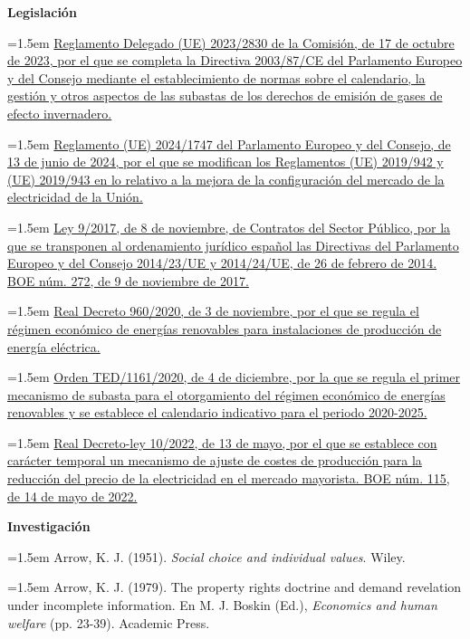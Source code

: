 \documentclass[10pt,a4paper]{article}
\begin{document}
\textbf{Legislación}

\noindent\hangindent=1.5em \href{https://eur-lex.europa.eu/eli/reg_del/2023/2830/oj}{Reglamento Delegado (UE) 2023/2830 de la Comisión, de 17 de octubre de 2023, por el que se completa la Directiva 2003/87/CE del Parlamento Europeo y del Consejo mediante el establecimiento de normas sobre el calendario, la gestión y otros aspectos de las subastas de los derechos de emisión de gases de efecto invernadero.}

\noindent\hangindent=1.5em \href{https://eur-lex.europa.eu/eli/reg/2024/1747/oj}{Reglamento (UE) 2024/1747 del Parlamento Europeo y del Consejo, de 13 de junio de 2024, por el que se modifican los Reglamentos (UE) 2019/942 y (UE) 2019/943 en lo relativo a la mejora de la configuración del mercado de la electricidad de la Unión.}

\noindent\hangindent=1.5em \href{https://www.boe.es/eli/es/l/2017/11/08/9}{Ley 9/2017, de 8 de noviembre, de Contratos del Sector Público, por la que se transponen al ordenamiento jurídico español las Directivas del Parlamento Europeo y del Consejo 2014/23/UE y 2014/24/UE, de 26 de febrero de 2014. BOE núm. 272, de 9 de noviembre de 2017.}

\noindent\hangindent=1.5em \href{https://www.boe.es/eli/es/rd/2020/11/03/960}{Real Decreto 960/2020, de 3 de noviembre, por el que se regula el régimen económico de energías renovables para instalaciones de producción de energía eléctrica.}

\noindent\hangindent=1.5em \href{https://www.boe.es/eli/es/o/2020/12/04/ted1161}{Orden TED/1161/2020, de 4 de diciembre, por la que se regula el primer mecanismo de subasta para el otorgamiento del régimen económico de energías renovables y se establece el calendario indicativo para el periodo 2020-2025.}

\noindent\hangindent=1.5em \href{https://www.boe.es/boe/dias/2022/05/14/pdfs/BOE-A-2022-7843.pdf}{Real Decreto-ley 10/2022, de 13 de mayo, por el que se establece con carácter temporal un mecanismo de ajuste de costes de producción para la reducción del precio de la electricidad en el mercado mayorista. BOE núm. 115, de 14 de mayo de 2022.}

\textbf{Investigación}

\noindent\hangindent=1.5em Arrow, K. J. (1951). \textit{Social choice and individual values}. Wiley.

\noindent\hangindent=1.5em Arrow, K. J. (1979). The property rights doctrine and demand revelation under incomplete information. En M. J. Boskin (Ed.), \textit{Economics and human welfare} (pp. 23-39). Academic Press.
\end{document}

